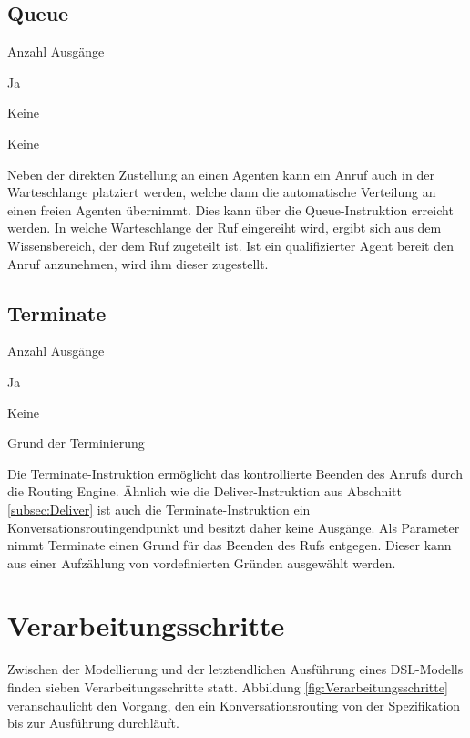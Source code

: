 \subsection{Queue}
\label{subsec:Queue}
\begin{labeling}{Anzahl Ausgänge}
\item [Eingang] Ja
\item [Anzahl Ausgänge] Keine
\item [Parameter] Keine
\item [Beschreibung] Neben der direkten Zustellung an einen Agenten kann ein Anruf auch in der Warteschlange platziert werden, welche dann die automatische Verteilung an einen freien Agenten übernimmt. Dies kann über die Queue-Instruktion erreicht werden. In welche Warteschlange der Ruf eingereiht wird, ergibt sich aus dem Wissensbereich, der dem Ruf zugeteilt ist. Ist ein qualifizierter Agent bereit den Anruf anzunehmen, wird ihm dieser zugestellt.
\end{labeling}


\subsection{Terminate}
\label{subsec:terminate}
\begin{labeling}{Anzahl Ausgänge}
\item [Eingang] Ja
\item [Anzahl Ausgänge] Keine
\item [Parameter] Grund der Terminierung
\item [Beschreibung] Die Terminate-Instruktion ermöglicht das kontrollierte Beenden des Anrufs durch die Routing Engine. Ähnlich wie die Deliver-Instruktion aus Abschnitt \ref{subsec:Deliver} ist auch die Terminate-Instruktion ein Konversationsroutingendpunkt und besitzt daher keine Ausgänge. Als Parameter nimmt Terminate einen Grund für das Beenden des Rufs entgegen. Dieser kann aus einer Aufzählung von vordefinierten Gründen ausgewählt werden.
\end{labeling}


\section{Verarbeitungsschritte}
\label{sec:Verarbeitungsschritte}
Zwischen der Modellierung und der letztendlichen Ausführung eines DSL-Modells finden sieben Verarbeitungsschritte statt. Abbildung \ref{fig:Verarbeitungsschritte} veranschaulicht den Vorgang, den ein Konversationsrouting von der Spezifikation bis zur Ausführung durchläuft.


